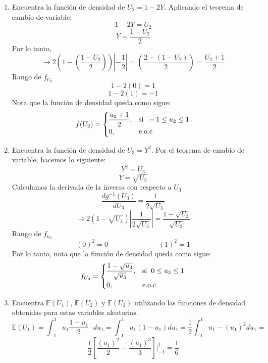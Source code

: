 \documentclass[11pt,a4paper]{report}
\begin{document}
\begin{enumerate}
\begin{enumerate}
     \item Encuentra la función de densidad de \( U_2 = 1 - 2Y \).
     Aplicando el teorema de cambio de variable:
     \[1-2Y = U_{2}\]
     \[Y = \dfrac{1-U_{2}}{2}\]
     Por lo tanto, \newline 
     \[ \rightarrow 2\left(1-\left( \dfrac{1-U_{2}}{2}\right) \right)\left| -\dfrac{1}{2}\right| =  \left(\dfrac{2-(1-U_{2})}{2}\right) = \dfrac{U_{2}+1}{2}\]
     Rango de $f_{U_{2}}$ \newline 
     \[1-2(0) = 1\]
     \[1 - 2(1) = -1\]
     Nota que la función de densidad queda como sigue: 
     \[f(U_{2}) = 
     \begin{cases}
     \dfrac{u_{2}+1}{2}, & \text{si} \hspace{0.2cm} -1 \leq u_{2} \leq 1 \\
     0, & \text{e.o.c}
     \end{cases}
     \]
    \item Encuentra la función de densidad de \( U_3 = Y^2 \).
    Por el teorema de cmabio de variable, hacemos lo siguiente: 
    \[Y^{2} = U_{3}\]
    \[Y = \sqrt{U_{3}}\]
    Calculamos la derivada de la inversa con respecto a $U_{3}$ 
    \[\dfrac{dg^{-1}(U_{3})}{dU_{3}} = \dfrac{1}{2\sqrt{U_{3}}} \]
    \[\rightarrow 2(1 - \sqrt{U_3}) \left|\dfrac{1}{2\sqrt{U_{3}}} \right| = \dfrac{1-\sqrt{U_{3}}}{\sqrt{U_{3}}}\]
    Rango de $f_{u_{3}}$ 
    \[(0)^{2} = 0 \hspace{3cm} (1)^{2} = 1\]
    Por lo tanto, nota que la función de densidad queda como sigue: \newline 
    \[f_{U_{3}} = 
    \begin{cases}
        \dfrac{1- \sqrt{u_{3}}}{\sqrt{u_{3}}}, & \text{si}\hspace{0.2cm} 0 \leq u_{3} \leq 1 \\
        0, & \text{e.o.c}
    \end{cases}
    \]
    \item Encuentra \( \mathbb{E}(U_1) \), \( \mathbb{E}(U_2) \) y \( \mathbb{E}(U_3) \) utilizando las funciones de densidad obtenidas para estas variables aleatorias.
   \begin{equation*}
            \mathbb{E}(U_{1}) = \int_{-1}^{1} u_{1} \dfrac{1-u_{1}}{2} \cdot du_{1} = \int_{-1}^{1} u_{1}(1-u_{1})du_{1} = \dfrac{1}{2} \int_{-1}^{1} u_{1}- (u_{1})^{2} du_{1} =
   \end{equation*}
    \[ \dfrac{1}{2} \left[ \dfrac{(u_{1})^{2}}{2} - \dfrac{(u_{1})^{3}}{3}\right] \bigg|_{-1}^{1} = \dfrac{1}{6}\]
    \begin{equation*}

\end{equation*}
\end{enumerate}
\end{enumerate}
\end{document}
